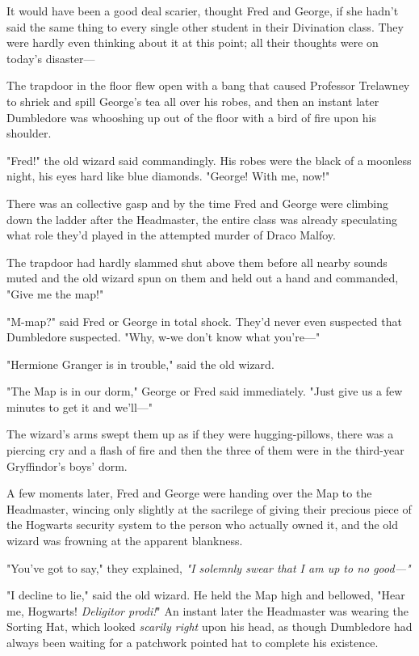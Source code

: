 It would have been a good deal scarier, thought Fred and George, if she hadn't
said the same thing to every single other student in their Divination class.
They were hardly even thinking about it at this point; all their thoughts were
on today's disaster---

The trapdoor in the floor flew open with a bang that caused Professor Trelawney
to shriek and spill George's tea all over his robes, and then an instant later
Dumbledore was whooshing up out of the floor with a bird of fire upon his
shoulder.

"Fred!" the old wizard said commandingly. His robes were the black of a
moonless night, his eyes hard like blue diamonds. "George! With me, now!"

There was an collective gasp and by the time Fred and George were climbing down
the ladder after the Headmaster, the entire class was already speculating what
role they'd played in the attempted murder of Draco Malfoy.

The trapdoor had hardly slammed shut above them before all nearby sounds muted
and the old wizard spun on them and held out a hand and commanded, "Give me the
map!"

"M-map?" said Fred or George in total shock. They'd never even suspected that
Dumbledore suspected. "Why, w-we don't know what you're\mbox{---}"

"Hermione Granger is in trouble," said the old wizard.

"The Map is in our dorm," George or Fred said immediately. "Just give us a few
minutes to get it and we'll\mbox{---}"

The wizard's arms swept them up as if they were hugging-pillows, there was a
piercing cry and a flash of fire and then the three of them were in the
third-year Gryffindor's boys' dorm.

A few moments later, Fred and George were handing over the Map to the
Headmaster, wincing only slightly at the sacrilege of giving their precious
piece of the Hogwarts security system to the person who actually owned it, and
the old wizard was frowning at the apparent blankness.

"You've got to say," they explained, \emph{"I solemnly swear that I am up to no
good\mbox{---}"}

"I decline to lie," said the old wizard. He held the Map high and bellowed,
"Hear me, Hogwarts! \emph{Deligitor prodi!}" An instant later the Headmaster
was wearing the Sorting Hat, which looked \emph{scarily right} upon his head,
as though Dumbledore had always been waiting for a patchwork pointed hat to
complete his existence.

